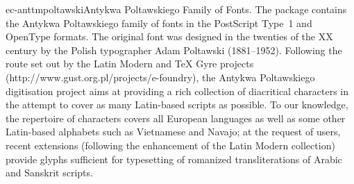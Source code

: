 \documentclass{ddltxtyp}
\begin{document}
\begin{package}{ec-anttm}{poltawski}{Antykwa Poltawskiego Family of Fonts.}
The package contains the Antykwa Poltawskiego family of fonts
in the PostScript Type~1 and OpenType formats. The original
font was designed in the twenties of the XX century by the
Polish typographer Adam Poltawski (1881--1952). Following the
route set out by the Latin Modern and {\TeX} Gyre projects
(http://www.gust.org.pl/projects/e-foundry), the Antykwa
Poltawskiego digitisation project aims at providing a rich
collection of diacritical characters in the attempt to cover as
many Latin-based scripts as possible. To our knowledge, the
repertoire of characters covers all European languages as well
as some other Latin-based alphabets such as Vietnamese and
Navajo; at the request of users, recent extensions (following
the enhancement of the Latin Modern collection) provide glyphs
sufficient for typesetting of romanized transliterations of
Arabic and Sanskrit scripts. %
\end{package}
\end{document}
